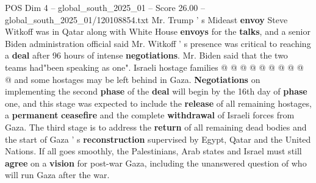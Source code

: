 \begin{textsample}{POS Dim 4 – global\_south\_2025\_01 – Score 26.00 – global\_south\_2025\_01/120108854.txt}
Mr.
Trump ' s Mideast \textbf{envoy} Steve Witkoff was in Qatar along with White House \textbf{envoys} for the \textbf{talks}, and a senior Biden administration official said Mr.
Witkoff ' s presence was critical to reaching a \textbf{deal} after 96 hours of intense \textbf{negotiations}.
Mr.
Biden said that the two teams had"been speaking as one".
Israeli hostage families @ @ @ @ @ @ @ @ @ @ and some hostages may be left behind in Gaza. \textbf{Negotiations} on implementing the second \textbf{phase} of the \textbf{deal} will begin by the 16th day of \textbf{phase} one, and this stage was expected to include the \textbf{release} of all remaining hostages, a \textbf{permanent} \textbf{ceasefire} and the complete \textbf{withdrawal} of Israeli forces from Gaza.
The third stage is to address the \textbf{return} of all remaining dead bodies and the start of Gaza ' s \textbf{reconstruction} supervised by Egypt, Qatar and the United Nations.
If all goes smoothly, the Palestinians, Arab states and Israel must still \textbf{agree} on a \textbf{vision} for post-war Gaza, including the unanswered question of who will run Gaza after the war.

\end{textsample}

